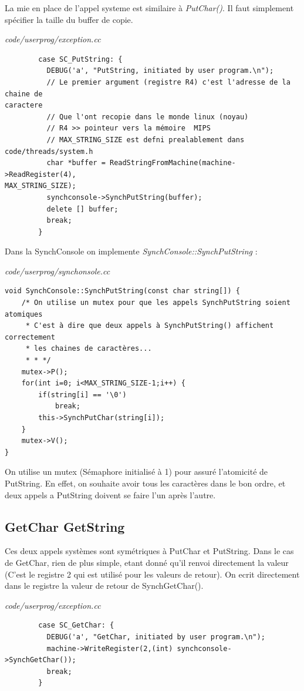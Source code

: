 \documentclass[a4paper,10pt]{article}
\begin{document}
La mie en place de l'appel systeme est similaire à \textit{PutChar()}. Il faut
simplement spécifier la taille du buffer de copie.

\textit{code/userprog/exception.cc}
\begin{lstlisting}
        case SC_PutString: {
          DEBUG('a', "PutString, initiated by user program.\n");
          // Le premier argument (registre R4) c'est l'adresse de la chaine de
caractere
          // Que l'ont recopie dans le monde linux (noyau)
          // R4 >> pointeur vers la mémoire  MIPS
          // MAX_STRING_SIZE est defni prealablement dans code/threads/system.h
          char *buffer = ReadStringFromMachine(machine->ReadRegister(4),
MAX_STRING_SIZE);
          synchconsole->SynchPutString(buffer);
          delete [] buffer;
          break;
        }
\end{lstlisting}


Dans la SynchConsole on implemente \textit{SynchConsole::SynchPutString} :

\textit{code/userprog/synchonsole.cc}
\begin{lstlisting}
void SynchConsole::SynchPutString(const char string[]) {
    /* On utilise un mutex pour que les appels SynchPutString soient atomiques
     * C'est à dire que deux appels à SynchPutString() affichent correctement
     * les chaines de caractères...
     * * */
    mutex->P();
    for(int i=0; i<MAX_STRING_SIZE-1;i++) {
        if(string[i] == '\0')
            break;
        this->SynchPutChar(string[i]);
    }
    mutex->V();
}
\end{lstlisting}

On utilise un mutex (Sémaphore initialisé à 1) pour assuré l'atomicité de
PutString. En effet, on souhaite avoir tous les caractères dans le bon ordre,
et deux appels a PutString doivent se faire l'un après l'autre.

\subsection{GetChar GetString}

Ces deux appels systèmes sont symétriques à PutChar et PutString. Dans le cas
de GetChar, rien de plus simple, etant donné qu'il renvoi directement la
valeur (C'est le registre 2 qui est utilisé pour les valeurs de retour). On
ecrit directement dans le registre la valeur de retour de SynchGetChar().

\textit{code/userprog/exception.cc}
\begin{lstlisting}
        case SC_GetChar: {
          DEBUG('a', "GetChar, initiated by user program.\n");
          machine->WriteRegister(2,(int) synchconsole->SynchGetChar());
          break;
        }
\end{lstlisting}
\end{document}
